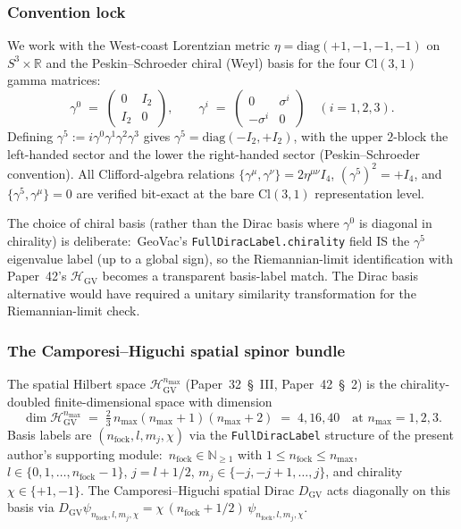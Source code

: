 \documentclass[11pt,a4paper]{article}
\theoremstyle{plain}
\theoremstyle{definition}
\newcommand{\nmax}{n_{\max}}
\newcommand{\sthree}{S^{3}}
\newcommand{\Hilb}{\mathcal{H}}
\newcommand{\R}{\mathbb{R}}
\newcommand{\N}{\mathbb{N}}
\newcommand{\DGV}{D_{\mathrm{GV}}}
\newcommand{\Cl}{\mathrm{Cl}}
\begin{document}
\subsubsection{Convention lock}

We work with the West-coast Lorentzian metric
$\eta = \mathrm{diag}(+1, -1, -1, -1)$ on $\sthree \times \R$
and the Peskin--Schroeder chiral (Weyl) basis for the four
$\Cl(3, 1)$ gamma matrices:
\begin{equation}\label{eq:gamma_chiral}
   \gamma^0 \;=\; \begin{pmatrix} 0 & I_2 \\ I_2 & 0 \end{pmatrix},
   \qquad
   \gamma^i \;=\; \begin{pmatrix} 0 & \sigma^i \\ -\sigma^i & 0 \end{pmatrix}
   \quad (i = 1, 2, 3).
\end{equation}
Defining $\gamma^5 := i \gamma^0 \gamma^1 \gamma^2 \gamma^3$ gives
$\gamma^5 = \mathrm{diag}(-I_2, +I_2)$, with the upper $2$-block the
left-handed sector and the lower the right-handed sector
(Peskin--Schroeder convention). All Clifford-algebra relations
$\{\gamma^\mu, \gamma^\nu\} = 2 \eta^{\mu\nu} I_4$,
$(\gamma^5)^2 = +I_4$, and $\{\gamma^5, \gamma^\mu\} = 0$ are verified
bit-exact at the bare $\Cl(3, 1)$ representation level.

The choice of chiral basis (rather than the Dirac basis where
$\gamma^0$ is diagonal in chirality) is deliberate:\ GeoVac's
\texttt{FullDiracLabel.chirality} field IS the $\gamma^5$ eigenvalue
label (up to a global sign), so the Riemannian-limit identification
with Paper~42's $\Hilb_{\mathrm{GV}}$ becomes a transparent basis-label
match. The Dirac basis alternative would have required a unitary
similarity transformation for the Riemannian-limit check.

\subsubsection{The Camporesi--Higuchi spatial spinor bundle}

The spatial Hilbert space $\Hilb_{\mathrm{GV}}^{\nmax}$
(Paper~32~\S~III, Paper~42~\S~2) is the chirality-doubled
finite-dimensional space with dimension
\begin{equation}\label{eq:dim_HGV}
   \dim \Hilb_{\mathrm{GV}}^{\nmax}
   \;=\; \tfrac{2}{3}\, \nmax (\nmax + 1)(\nmax + 2)
   \;=\; 4, 16, 40 \quad \text{at } \nmax = 1, 2, 3.
\end{equation}
Basis labels are $(n_\text{fock}, l, m_j, \chi)$ via the
\texttt{FullDiracLabel} structure of the present author's supporting
module:\ $n_\text{fock} \in \N_{\ge 1}$ with
$1 \le n_\text{fock} \le \nmax$, $l \in \{0, 1, \ldots, n_\text{fock} -
1\}$, $j = l + 1/2$, $m_j \in \{-j, -j+1, \ldots, j\}$, and chirality
$\chi \in \{+1, -1\}$. The Camporesi--Higuchi spatial Dirac $\DGV$
acts diagonally on this basis via
$\DGV \psi_{n_\text{fock}, l, m_j, \chi} = \chi\,(n_\text{fock} + 1/2)
\, \psi_{n_\text{fock}, l, m_j, \chi}$.
\end{document}
